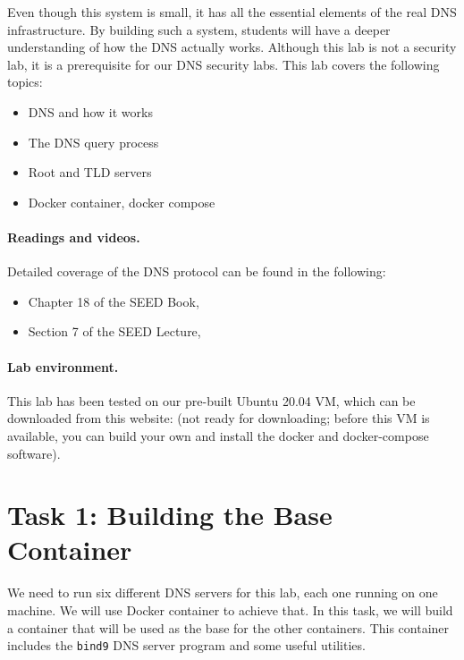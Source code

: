 Even though this system is small, it has all the essential
elements of the real DNS infrastructure. By building such a system,
students will have a deeper understanding of how the DNS actually works. 
Although this lab is not a security lab, it is a prerequisite for 
our DNS security labs. This lab covers the following topics:

\begin{itemize}[noitemsep]
\item DNS and how it works
\item The DNS query process
\item Root and TLD servers
\item Docker container, docker compose
\end{itemize}



\paragraph{Readings and videos.}
Detailed coverage of the DNS protocol can be found in the following:

\begin{itemize}
\item Chapter 18 of the SEED Book, \seedbook
\item Section 7 of the SEED Lecture, \seedisvideo
\end{itemize}


\paragraph{Lab environment.} This lab has been tested on our pre-built
Ubuntu 20.04 VM, which can be downloaded 
from this website: (not ready for downloading; before this VM is available,
you can build your own and install the docker and docker-compose software).



\section{Task 1: Building the Base Container}

We need to run six different DNS servers for this lab, each one running on one machine. 
We will use Docker container to achieve that. In this task, we will
build a container that will be used as the base for the other containers. 
This container includes the 
\texttt{bind9} DNS server program and some useful utilities. 


